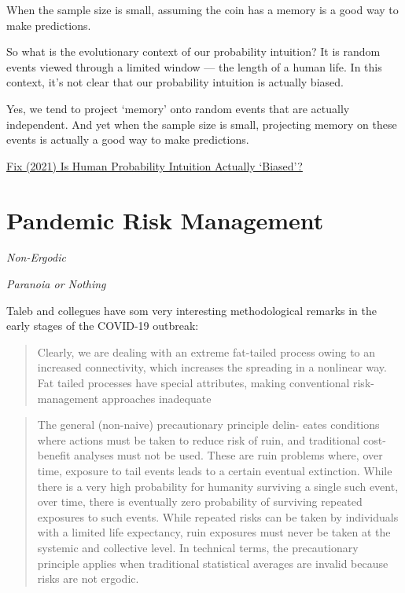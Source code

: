 \documentclass[
]{book}
\begin{document}
When the sample size is small, assuming the coin has a memory is a good way to make predictions.

So what is the evolutionary context of our probability intuition? It is random events viewed through a limited window --- the length of a human life. In this context, it's not clear that our probability intuition is actually biased.

Yes, we tend to project `memory' onto random events that are actually independent. And yet when the sample size is small, projecting memory on these events is actually a good way to make predictions.

\href{https://economicsfromthetopdown.com/2021/07/09/is-human-probability-intuition-actually-biased/}{Fix (2021) Is Human Probability Intuition Actually `Biased'?}

\hypertarget{pandemic-risk-management}{%
\section{Pandemic Risk Management}\label{pandemic-risk-management}}

\emph{Non-Ergodic}

\emph{Paranoia or Nothing}

Taleb and collegues have som very interesting methodological
remarks in the early stages of the COVID-19 outbreak:

\begin{quote}
Clearly, we are dealing with an extreme fat-tailed process
owing to an increased connectivity, which increases the
spreading in a nonlinear way. Fat tailed processes
have special attributes, making conventional risk-management
approaches inadequate
\end{quote}

\begin{quote}
The general (non-naive) precautionary principle delin-
eates conditions where actions must be taken to reduce risk
of ruin, and traditional cost-benefit analyses must not be used.
These are ruin problems where, over time, exposure to tail
events leads to a certain eventual extinction. While there
is a very high probability for humanity surviving a single
such event, over time, there is eventually zero probability of
surviving repeated exposures to such events. While repeated
risks can be taken by individuals with a limited life expectancy,
ruin exposures must never be taken at the systemic and
collective level. In technical terms, the precautionary principle
applies when traditional statistical averages are invalid because
risks are not ergodic.
\end{quote}
\end{document}

